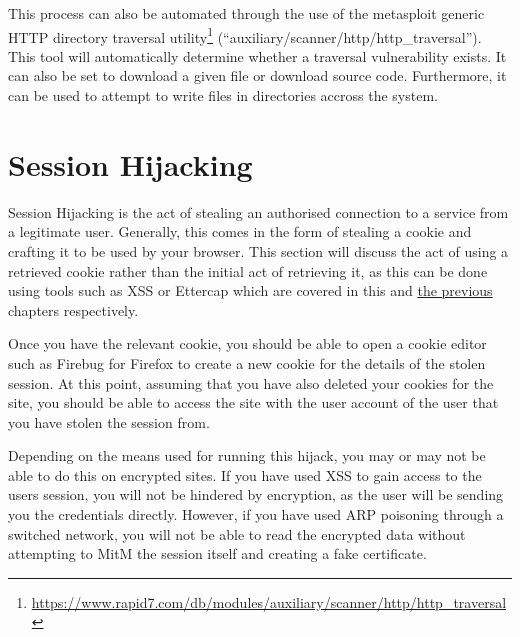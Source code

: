 		This process can also be automated through the use of the metasploit generic HTTP directory traversal 
		utility\footnote{\url{https://www.rapid7.com/db/modules/auxiliary/scanner/http/http_traversal}} 
		(``auxiliary/scanner/http/http\_traversal'').
		This tool will automatically determine whether a traversal vulnerability exists. 
		It can also be set to download a given file or download source code. 
		Furthermore, it can be used to attempt to write files in directories accross the system. 
	\section{Session Hijacking}
		Session Hijacking is the act of stealing an authorised connection to a service from a legitimate user. 
		Generally, this comes in the form of stealing a cookie and crafting it to be used by your browser. 
		This section will discuss the act of using a retrieved cookie rather than the initial act of retrieving it, 
		as this can be done using tools such as XSS or Ettercap which are covered in this and \href{ch:NetworkPenetration}{the previous} chapters respectively. 

		Once you have the relevant cookie, you should be able to open a cookie editor such as Firebug for Firefox to create a new cookie for the details of the stolen session. 
		At this point, assuming that you have also deleted your cookies for the site, you should be able to access the site with the user account of the user that you have stolen the session from. 

		Depending on the means used for running this hijack, you may or may not be able to do this on encrypted sites.
		If you have used XSS to gain access to the users session, you will not be hindered by encryption, as the user will be sending you the credentials directly. 
		However, if you have used ARP poisoning through a switched network, you will not be able to read the encrypted data without attempting to MitM the session itself and creating a fake certificate. 
